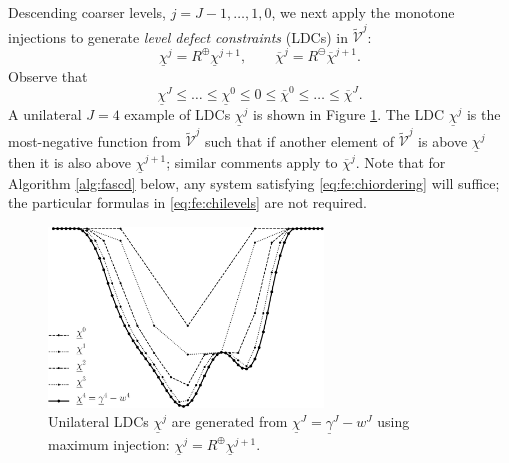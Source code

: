 \documentclass[letterpaper,final,12pt,reqno]{amsart}
\theoremstyle{cstyle}
\theoremstyle{cstyle*}
\theoremstyle{dstyle}
\numberwithin{equation}{section}
\numberwithin{figure}{section}
\numberwithin{table}{section}
\numberwithin{theorem}{section}
\newcommand{\maxR}{R^{\bm{\oplus}}}
\newcommand{\minR}{R^{\bm{\ominus}}}
\begin{document}
Descending coarser levels, $j=J-1,\dots,1,0$, we next apply the monotone injections to generate \emph{level defect constraints} (LDCs) in $\tilde{\mathcal{V}}^j$:
\begin{equation}
\underline{\chi}^{j} = \maxR \underline{\chi}^{j+1}, \qquad \overline{\chi}^{j} = \minR \overline{\chi}^{j+1}. \label{eq:fe:chilevels}
\end{equation}
Observe that
\begin{equation}
\underline{\chi}^{J} \le \dots \le \underline{\chi}^0 \le 0 \le \overline{\chi}^0 \le \dots \le \overline{\chi}^J. \label{eq:fe:chiordering}
\end{equation}
A unilateral $J=4$ example of LDCs $\underline{\chi}^j$ is shown in Figure \ref{fig:chiphilevels}.  The LDC $\underline{\chi}^j$ is the most-negative function from $\tilde{\mathcal{V}}^j$ such that if another element of $\tilde{\mathcal{V}}^j$ is above $\underline{\chi}^j$ then it is also above $\underline{\chi}^{j+1}$; similar comments apply to $\overline{\chi}^{j}$.  Note that for Algorithm \ref{alg:fascd} below, any system satisfying \eqref{eq:fe:chiordering} will suffice; the particular formulas in \eqref{eq:fe:chilevels} are not required.

\begin{figure}[ht]
\includegraphics[width=0.65\textwidth]{fixfigs/chiphilevels.pdf}
\caption{Unilateral LDCs $\underline{\chi}^j$ are generated from $\underline{\chi}^J = \underline{\gamma}^J - w^J$ using maximum injection: $\underline{\chi}^j = \maxR \underline{\chi}^{j+1}$.}
\label{fig:chiphilevels}
\end{figure}
\end{document}
